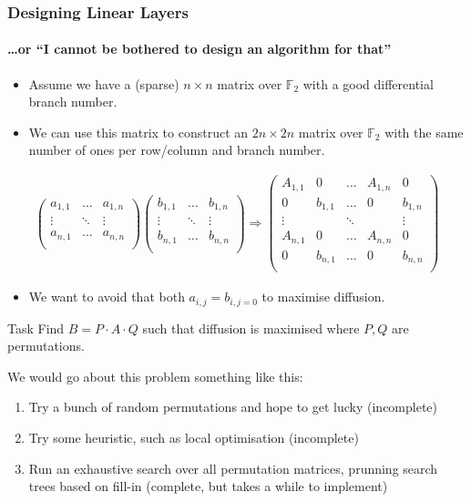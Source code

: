 \documentclass[9pt]{beamer}
\newcommand{\field}[1]{\ensuremath{\mathbb{#1}}}
\newcommand{\F}{\ensuremath{\field{F}}}
\begin{document}
\begin{frame}[allowframebreaks]
\frametitle{Designing Linear Layers}
\framesubtitle{\dots or ``I cannot be bothered to design an algorithm for that''}
\begin{itemize}
 \item Assume we have a (sparse) $n \times n$ matrix over $\F_2$ with a good differential branch number.
 \item We can use this matrix to construct an $2n \times 2n$ matrix over $\F_2$ with the same number of ones per row/column and branch number.
\end{itemize}

\begin{eqnarray*}
\left(\begin{array}{ccc}
a_{1,1} & \dots & a_{1,n}\\
\vdots  & \ddots &  \vdots\\
a_{n,1} & \dots & a_{n,n}\\
\end{array}\right)
\left(\begin{array}{ccc}
b_{1,1} & \dots & b_{1,n}\\
\vdots  & \ddots &  \vdots\\
b_{n,1} & \dots & b_{n,n}\\
\end{array}\right) \Rightarrow
\left(\begin{array}{cc|c|cc}
A_{1,1} & 0 & \dots & A_{1,n} & 0\\
0 & b_{1,1} & \dots & 0 & b_{1,n}\\
\hline
\vdots  & & \ddots & & \vdots\\
\hline
A_{n,1} & 0 & \dots & A_{n,n} & 0\\
0 & b_{n,1} & \dots & 0 & b_{n,n}\\
\end{array}\right)
\end{eqnarray*}

\begin{itemize}
 \item We want to avoid that both $a_{i,j} = b_{i,j = 0}$ to maximise diffusion.
\end{itemize}

\begin{block}{Task}
Find $B = P \cdot A \cdot Q$ such that diffusion is maximised where $P,Q$ are permutations.
\end{block}

\framebreak

We would go about this problem something like this:
\begin{enumerate}
 \item Try a bunch of random permutations and hope to get lucky (incomplete)
 \item Try some heuristic, such as local optimisation (incomplete)
 \item Run an exhaustive search over all permutation matrices, prunning search trees based on fill-in (complete, but takes a while to implement)
\end{enumerate}


\end{frame}
\end{document}
